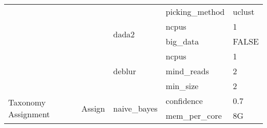 \begin{table}[h]
{\begin{tabular}{lllll}
                                          &                                                          &                                        & picking\_method                        & uclust                                                                                                   \\
                                          &                                                          & \multirow{2}{*}{dada2}                 & ncpus                                  & 1                                                                                                        \\
                                          &                                                          &                                        & big\_data                              & FALSE                                                                                                    \\
                                          &                                                          & \multirow{3}{*}{deblur}                & ncpus                                  & 1                                                                                                        \\
                                          &                                                          &                                        & mind\_reads                            & 2                                                                                                        \\
                                          &                                                          &                                        & min\_size                              & 2                                                                                                        \\ \hline
\multirow{7}{*}{Taxonomy Assignment}      & \multirow{7}{*}{Assign}                                  & \multirow{3}{*}{naive\_bayes}          & confidence                             & 0.7                                                                                                      \\
                                          &                                                          &                                        & mem\_per\_core                         & 8G                                                                                                       \\

\end{tabular}}
\end{table}
